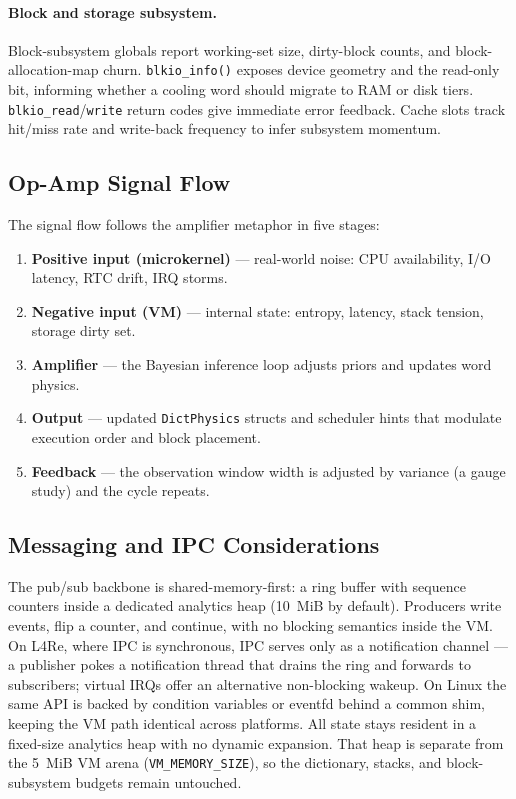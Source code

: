 \paragraph{Block and storage subsystem.} Block-subsystem globals report working-set
size, dirty-block counts, and block-allocation-map churn. \texttt{blkio\_info()}
exposes device geometry and the read-only bit, informing whether a cooling word should
migrate to RAM or disk tiers. \texttt{blkio\_read}/\texttt{write} return codes give
immediate error feedback. Cache slots track hit/miss rate and write-back frequency to
infer subsystem momentum.

\subsection{Op-Amp Signal Flow}

The signal flow follows the amplifier metaphor in five stages:

\begin{enumerate}
  \item \textbf{Positive input (microkernel)} --- real-world noise: CPU availability,
        I/O latency, RTC drift, IRQ storms.
  \item \textbf{Negative input (VM)} --- internal state: entropy, latency, stack
        tension, storage dirty set.
  \item \textbf{Amplifier} --- the Bayesian inference loop adjusts priors and updates
        word physics.
  \item \textbf{Output} --- updated \texttt{DictPhysics} structs and scheduler hints
        that modulate execution order and block placement.
  \item \textbf{Feedback} --- the observation window width is adjusted by variance (a
        gauge study) and the cycle repeats.
\end{enumerate}

\subsection{Messaging and IPC Considerations}

The pub/sub backbone is shared-memory-first: a ring buffer with sequence counters
inside a dedicated analytics heap (10~MiB by default). Producers write events, flip a
counter, and continue, with no blocking semantics inside the VM. On L4Re, where IPC is
synchronous, IPC serves only as a notification channel --- a publisher pokes a
notification thread that drains the ring and forwards to subscribers; virtual IRQs
offer an alternative non-blocking wakeup. On Linux the same API is backed by condition
variables or eventfd behind a common shim, keeping the VM path identical across
platforms. All state stays resident in a fixed-size analytics heap with no dynamic
expansion. That heap is separate from the 5~MiB VM arena (\texttt{VM\_MEMORY\_SIZE}),
so the dictionary, stacks, and block-subsystem budgets remain untouched.

